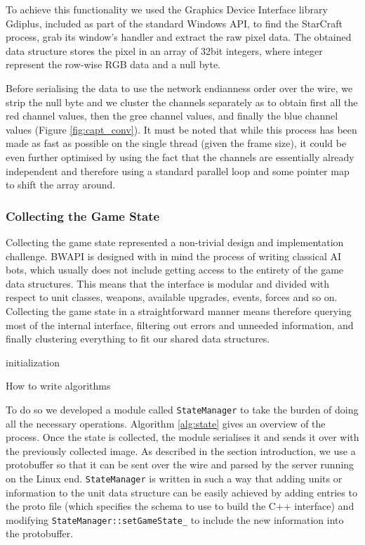 To achieve this functionality we used the Graphics Device Interface library
Gdiplus, included as part of the standard Windows API, to find the StarCraft
process, grab its window's handler and extract the raw pixel data. The obtained
data structure stores the pixel in an array of 32bit integers, where integer
represent the row-wise RGB data and a null byte. 

Before serialising the data to use the network endianness order over the wire,
we strip the null byte and we cluster the channels separately as to obtain first
all the red channel values, then the gree channel values, and finally the blue
channel values (Figure \ref{fig:capt_conv}). It must be noted that while this
process has been made as fast as possible on the single thread (given the frame
size), it could be even further optimised by using the fact that the channels
are essentially already independent and therefore using a standard parallel loop
and some pointer map to shift the array around.


\subsubsection{Collecting the Game State}

Collecting the game state represented a non-trivial design and implementation
challenge. BWAPI is designed with in mind the process of writing classical AI
bots, which usually does not include getting access to the entirety of the game
data structures. This means that the interface is modular and divided with
respect to unit classes, weapons, available upgrades, events, forces and so on.
Collecting the game state in a straightforward manner means therefore querying
most of the internal interface, filtering out errors and unneeded information,
and finally clustering everything to fit our shared data structures. 

\begin{algorithm}[H]
\SetAlgoLined
{}
 initialization\;
 \caption{How to write algorithms}
 \label{alg:state}
\end{algorithm}

To do so we developed a module called \texttt{StateManager} to take the burden
of doing all the necessary operations. Algorithm \ref{alg:state} gives an
overview of the process. Once the state is collected, the module serialises it
and sends it over with the previously collected image. As described in the
section introduction, we use a protobuffer so that it can be sent over the wire
and parsed by the server running on the Linux end. \texttt{StateManager} is
written in such a way that adding units or information to the unit data
structure can be easily achieved by adding entries to the proto file (which
specifies the schema to use to build the C++ interface) and modifying
\texttt{StateManager::setGameState\_} to include the new information into the
protobuffer.

